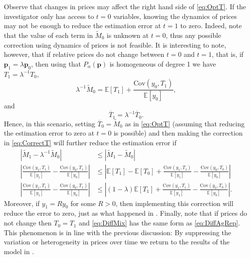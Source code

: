 \documentclass[english, a4paper, 12pt]{article}
\begin{document}
Observe that changes in prices may affect the right hand side of \eqref{eq:OptT}. If the investigator only has access to $t =0$ variables, knowing the dynamics of prices may not be enough to reduce the estimation error at $t =1$ to zero. Indeed, note that the value of each term in $\tilde{M}_{0}$ is unknown at $t=0$, thus any possible correction using dynamics of prices is not feasible. It is interesting to note, however, that if relative prices do not change between $t=0$ and $t=1$, that is, if $\mathbf{p}_{1} = \lambda \mathbf{p}_{0}$, then using that $P_{\alpha}(\mathbf{p})$ is homogeneous of degree 1 we have $T_{1} = \lambda^{-1}T_{0}$,
	$$\lambda^{-1}\tilde{M}_{0} = \mathbb{E}[T_{1}] + \frac{\mathrm{Cov}\left(y_{0}, T_{1} \right)}{\mathbb{E}[y_{0}]},$$
and
	\begin{equation} \label{eq:CorrectT}
		\overline{T}_{1} = \lambda^{-1}\overline{T}_{0}.
	\end{equation}
Hence, in this scenario, setting $\overline{T}_{0} = \tilde{M}_{0}$ as in \eqref{eq:OptT} (assuming that reducing the estimation error to zero at $t=0$ is possible) and then making the correction in \eqref{eq:CorrectT} will further reduce the estimation error if
	\begin{align*}
		\left|\tilde{M}_{1} - \lambda^{-1}\tilde{M}_{0} \right|
			&\leq \left|\tilde{M}_{1} - \tilde{M}_{0} \right|	\\
		\left| \frac{\mathrm{Cov}\left(y_{1}, T_{1} \right)}{\mathbb{E}[y_{1}]} - \frac{\mathrm{Cov}\left(y_{0}, T_{1} \right)}{\mathbb{E}[y_{0}]} \right|
			&\leq \left| \mathbb{E}\left[T_{1} \right] - \mathbb{E}\left[T_{0} \right] + \frac{\mathrm{Cov}\left(y_{1}, T_{1} \right)}{\mathbb{E}[y_{1}]} - \frac{\mathrm{Cov}\left(y_{0}, T_{0} \right)}{\mathbb{E}[y_{0}]} \right|	\\
		\left| \frac{\mathrm{Cov}\left(y_{1}, T_{1} \right)}{\mathbb{E}[y_{1}]} - \frac{\mathrm{Cov}\left(y_{0}, T_{1} \right)}{\mathbb{E}[y_{0}]} \right|
			&\leq \left| (1-\lambda)\mathbb{E}\left[T_{1} \right] + \frac{\mathrm{Cov}\left(y_{1}, T_{1} \right)}{\mathbb{E}[y_{1}]} - \frac{\mathrm{Cov}\left(y_{0}, T_{0} \right)}{\mathbb{E}[y_{0}]} \right|.
	\end{align*}
Moreover, if $y_{1} = Ry_{0}$ for some $R>0$, then implementing this correction will reduce the error to zero, just as what happened in . Finally, note that if prices do not change then $T_{0} = T_{1}$ and \eqref{eq:DiffMix} has the same form as \eqref{eq:DiffAgRep}. This phenomenon is in line with the previous discussion: By suppressing the variation or heterogeneity in prices over time we return to the results of the model in .
\end{document}
